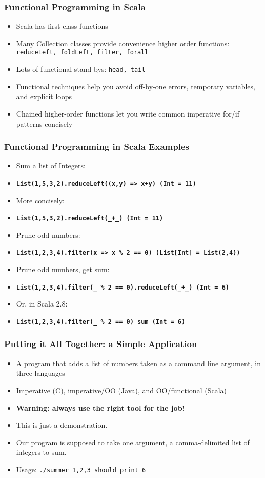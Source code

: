 \begin{frame} 
\frametitle{Functional Programming in Scala}
\begin{itemize}
  \item<1-> Scala has first-class functions
  \item<2-> Many Collection classes provide convenience higher order functions: \tt\small{reduceLeft, foldLeft, filter, forall}
  \item<3-> Lots of functional stand-bys: \tt\small{head, tail}
  \item<4-> Functional techniques help you avoid off-by-one errors, temporary variables, and explicit loops
  \item<5-> Chained higher-order functions let you write common imperative for/if patterns concisely
\end{itemize}
\end{frame} 

\begin{frame} 
\frametitle{Functional Programming in Scala Examples}
\begin{itemize}
  \item<1-> Sum a list of Integers:
  \item<1-> \tt\small\textbf{List(1,5,3,2).reduceLeft((x,y) => x+y) (Int = 11)}
  \item<2-> More concisely:
  \item<2-> \tt\small\textbf{List(1,5,3,2).reduceLeft(\_+\_) (Int = 11)}
  \item<3-> Prune odd numbers:
  \item<3-> \tt\small\textbf{List(1,2,3,4).filter(x => x \% 2 == 0) (List[Int] = List(2,4))}
  \item<4-> Prune odd numbers, get sum:
  \item<4-> \tt\small\textbf{List(1,2,3,4).filter(\_ \% 2 == 0).reduceLeft(\_+\_) (Int = 6)}
  \item<5-> Or, in Scala 2.8:
  \item<5-> \tt\small\textbf{List(1,2,3,4).filter(\_ \% 2 == 0) sum (Int = 6)}
\end{itemize}
\end{frame} 

\begin{frame} 
\frametitle{Putting it All Together: a Simple Application}
\begin{itemize}
  \item<1-> A program that adds a list of numbers taken as a command line argument, in three languages 
  \item<2-> Imperative (C), imperative/OO (Java), and OO/functional (Scala)
  \item<3-> \textbf{Warning: always use the right tool for the job!}
  \item<3-> This is just a demonstration.
  \item<4-> Our program is supposed to take one argument, a comma-delimited list of integers to sum.
  \item<4-> Usage: \tt{./summer 1,2,3} should print 6
\end{itemize}
\end{frame} 

